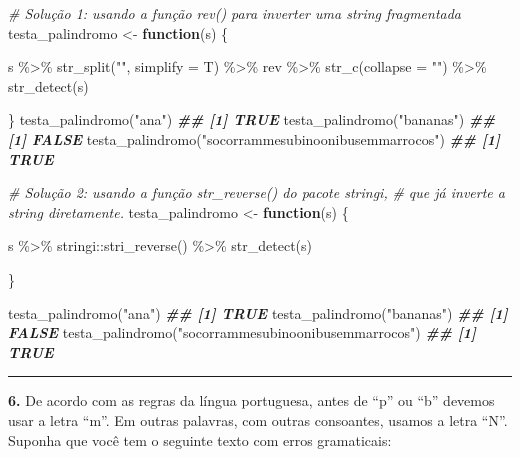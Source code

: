 \documentclass[
]{book}
\newenvironment{Shaded}{\begin{snugshade}}{\end{snugshade}}
\newcommand{\AttributeTok}[1]{\textcolor[rgb]{0.77,0.63,0.00}{#1}}
\newcommand{\CommentTok}[1]{\textcolor[rgb]{0.56,0.35,0.01}{\textit{#1}}}
\newcommand{\ControlFlowTok}[1]{\textcolor[rgb]{0.13,0.29,0.53}{\textbf{#1}}}
\newcommand{\DocumentationTok}[1]{\textcolor[rgb]{0.56,0.35,0.01}{\textbf{\textit{#1}}}}
\newcommand{\FunctionTok}[1]{\textcolor[rgb]{0.00,0.00,0.00}{#1}}
\newcommand{\NormalTok}[1]{#1}
\newcommand{\OtherTok}[1]{\textcolor[rgb]{0.56,0.35,0.01}{#1}}
\newcommand{\SpecialCharTok}[1]{\textcolor[rgb]{0.00,0.00,0.00}{#1}}
\newcommand{\StringTok}[1]{\textcolor[rgb]{0.31,0.60,0.02}{#1}}
\begin{document}
\begin{Shaded}
\begin{Highlighting}[]
\CommentTok{\# Solução 1: usando a função rev() para inverter uma string fragmentada}
\NormalTok{testa\_palindromo }\OtherTok{\textless{}{-}} \ControlFlowTok{function}\NormalTok{(s) \{}
  
\NormalTok{  s }\SpecialCharTok{\%\textgreater{}\%}
    \FunctionTok{str\_split}\NormalTok{(}\StringTok{""}\NormalTok{, }\AttributeTok{simplify =}\NormalTok{ T) }\SpecialCharTok{\%\textgreater{}\%} 
\NormalTok{    rev }\SpecialCharTok{\%\textgreater{}\%} 
    \FunctionTok{str\_c}\NormalTok{(}\AttributeTok{collapse =} \StringTok{""}\NormalTok{) }\SpecialCharTok{\%\textgreater{}\%} 
    \FunctionTok{str\_detect}\NormalTok{(s)}
  
\NormalTok{\}}
\FunctionTok{testa\_palindromo}\NormalTok{(}\StringTok{"ana"}\NormalTok{)}
\DocumentationTok{\#\# [1] TRUE}
\FunctionTok{testa\_palindromo}\NormalTok{(}\StringTok{"bananas"}\NormalTok{)}
\DocumentationTok{\#\# [1] FALSE}
\FunctionTok{testa\_palindromo}\NormalTok{(}\StringTok{"socorrammesubinoonibusemmarrocos"}\NormalTok{)}
\DocumentationTok{\#\# [1] TRUE}

\CommentTok{\# Solução 2: usando a função str\_reverse() do pacote stringi,}
\CommentTok{\# que já inverte a string diretamente.}
\NormalTok{testa\_palindromo }\OtherTok{\textless{}{-}} \ControlFlowTok{function}\NormalTok{(s) \{}
  
\NormalTok{  s }\SpecialCharTok{\%\textgreater{}\%} 
\NormalTok{    stringi}\SpecialCharTok{::}\FunctionTok{stri\_reverse}\NormalTok{() }\SpecialCharTok{\%\textgreater{}\%} 
    \FunctionTok{str\_detect}\NormalTok{(s)}
  
\NormalTok{\}}

\FunctionTok{testa\_palindromo}\NormalTok{(}\StringTok{"ana"}\NormalTok{)}
\DocumentationTok{\#\# [1] TRUE}
\FunctionTok{testa\_palindromo}\NormalTok{(}\StringTok{"bananas"}\NormalTok{)}
\DocumentationTok{\#\# [1] FALSE}
\FunctionTok{testa\_palindromo}\NormalTok{(}\StringTok{"socorrammesubinoonibusemmarrocos"}\NormalTok{)}
\DocumentationTok{\#\# [1] TRUE}
\end{Highlighting}
\end{Shaded}

\begin{center}\rule{0.5\linewidth}{0.5pt}\end{center}

\textbf{6.} De acordo com as regras da língua portuguesa, antes de ``p'' ou ``b'' devemos usar a letra ``m''. Em outras palavras, com outras consoantes, usamos a letra ``N''. Suponha que você tem o seguinte texto com erros gramaticais:
\end{document}
